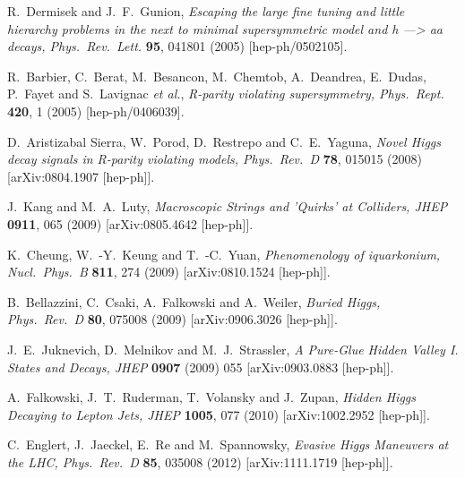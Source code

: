 \documentclass{JHEP3}
\begin{document}
\begin{thebibliography}{99}
  R.~Dermisek and J.~F.~Gunion,
  \textit{Escaping the large fine tuning and little hierarchy problems in the next to minimal supersymmetric model and h ---> aa decays,
  Phys.\ Rev.\ Lett.} {\bf 95}, 041801 (2005)
  [hep-ph/0502105].

  R.~Barbier, C.~Berat, M.~Besancon, M.~Chemtob, A.~Deandrea, E.~Dudas, P.~Fayet and S.~Lavignac {\it et al.},
  \textit{R-parity violating supersymmetry,
  Phys.\ Rept.} {\bf 420}, 1 (2005)
  [hep-ph/0406039].

  D.~Aristizabal Sierra, W.~Porod, D.~Restrepo and C.~E.~Yaguna,
  \textit{Novel Higgs decay signals in R-parity violating models,
  Phys.\ Rev.\ D} {\bf 78}, 015015 (2008)
  [arXiv:0804.1907 [hep-ph]].

  J.~Kang and M.~A.~Luty,
  \textit{Macroscopic Strings and 'Quirks' at Colliders,
  JHEP} {\bf 0911}, 065 (2009)
  [arXiv:0805.4642 [hep-ph]].

  K.~Cheung, W.~-Y.~Keung and T.~-C.~Yuan,
  \textit{Phenomenology of iquarkonium,
  Nucl.\ Phys.\ B} {\bf 811}, 274 (2009)
  [arXiv:0810.1524 [hep-ph]].

  B.~Bellazzini, C.~Csaki, A.~Falkowski and A.~Weiler,
  \textit{Buried Higgs,
  Phys.\ Rev.\ D} {\bf 80}, 075008 (2009)
  [arXiv:0906.3026 [hep-ph]].

  J.~E.~Juknevich, D.~Melnikov and M.~J.~Strassler,
  \textit{A Pure-Glue Hidden Valley I. States and Decays,
  JHEP} {\bf 0907} (2009) 055
  [arXiv:0903.0883 [hep-ph]].

  A.~Falkowski, J.~T.~Ruderman, T.~Volansky and J.~Zupan,
  \textit{Hidden Higgs Decaying to Lepton Jets,
  JHEP} {\bf 1005}, 077 (2010)
  [arXiv:1002.2952 [hep-ph]].

  C.~Englert, J.~Jaeckel, E.~Re and M.~Spannowsky,
  \textit{Evasive Higgs Maneuvers at the LHC,
  Phys.\ Rev.\ D} {\bf 85}, 035008 (2012)
  [arXiv:1111.1719 [hep-ph]].



\end{thebibliography}
\end{document}
